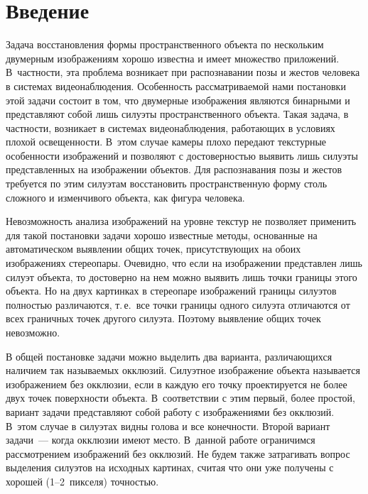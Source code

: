       \begin{multicols}{2}

      \label{st\stat}

\section{Введение}
     
     Задача восстановления формы пространственного объекта по нескольким 
двумерным изображениям хорошо известна и имеет множество приложений. 
В~частности, эта проблема возникает при распознавании позы и жестов 
человека в системах видеонаблюдения. Особенность рассматриваемой нами 
постановки этой задачи состоит в том, что двумерные изображения являются 
бинарными и представляют собой лишь силуэты пространственного объекта. 
Такая задача, в частности, возникает в системах видеонаблюдения, 
работающих в условиях плохой освещенности. В~этом случае камеры плохо 
передают текстурные особенности изображений и позволяют с достоверностью 
выявить лишь силуэты представленных на изображении объектов. Для 
распознавания позы и жестов требуется по этим силуэтам восстановить 
пространственную форму столь сложного и изменчивого объекта, как фигура 
человека.
     
     Невозможность анализа изображений на уровне текстур не позволяет 
применить для такой постановки задачи хорошо известные методы, 
основанные на автоматическом выявлении общих точек, присутствующих на 
обоих изображениях стереопары. Очевидно, что если на изображении 
пред\-став\-лен лишь силуэт объекта, то достоверно на нем можно выявить лишь 
точки границы этого объекта. Но на двух картинках в стереопаре изображений 
границы силуэтов полностью различаются, т.\,е.\ все точки границы одного 
силуэта отличаются от всех граничных точек другого силуэта. Поэтому 
выявление общих точек невозможно.
     
     В общей постановке задачи можно выделить два варианта, 
различающихся наличием так называемых окклюзий. Силуэтное изображение 
объекта называется изображением без окклюзии, если в каждую его точку 
проектируется не более двух точек поверхности объекта. В~соответствии с 
этим первый, более простой, вариант задачи представляют собой работу с 
изображениями без окклюзий. В~этом случае в силуэтах видны голова и все 
конечности. Второй вариант задачи~--- когда окклюзии имеют место. 
В~данной работе ограничимся рассмотрением изображений без окклюзий. Не 
будем также затрагивать вопрос выделения силуэтов на исходных картинах, 
считая что они уже получены с хорошей (1--2~пикселя) точностью.
     

\end{multicols}
